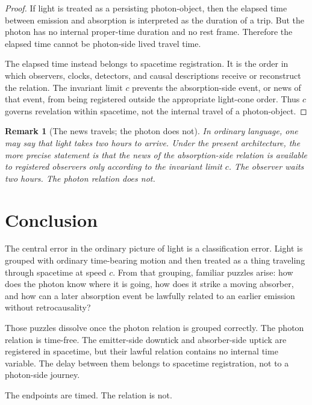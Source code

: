 \documentclass[12pt,onecolumn]{article}
\newtheorem{remark}{Remark}
\begin{document}
\begin{proof}
If light is treated as a persisting photon-object, then the elapsed time between emission and absorption is interpreted as the duration of a trip. But the photon has no internal proper-time duration and no rest frame. Therefore the elapsed time cannot be photon-side lived travel time.

The elapsed time instead belongs to spacetime registration. It is the order in which observers, clocks, detectors, and causal descriptions receive or reconstruct the relation. The invariant limit $c$ prevents the absorption-side event, or news of that event, from being registered outside the appropriate light-cone order. Thus $c$ governs revelation within spacetime, not the internal travel of a photon-object.
\end{proof}

\begin{remark}[The news travels; the photon does not]
In ordinary language, one may say that light takes two hours to arrive. Under the present architecture, the more precise statement is that the news of the absorption-side relation is available to registered observers only according to the invariant limit $c$. The observer waits two hours. The photon relation does not.
\end{remark}

\section{Conclusion}

The central error in the ordinary picture of light is a classification error. Light is grouped with ordinary time-bearing motion and then treated as a thing traveling through spacetime at speed $c$. From that grouping, familiar puzzles arise: how does the photon know where it is going, how does it strike a moving absorber, and how can a later absorption event be lawfully related to an earlier emission without retrocausality?

Those puzzles dissolve once the photon relation is grouped correctly. The photon relation is time-free. The emitter-side downtick and absorber-side uptick are registered in spacetime, but their lawful relation contains no internal time variable. The delay between them belongs to spacetime registration, not to a photon-side journey.

The endpoints are timed. The relation is not.
\end{document}
